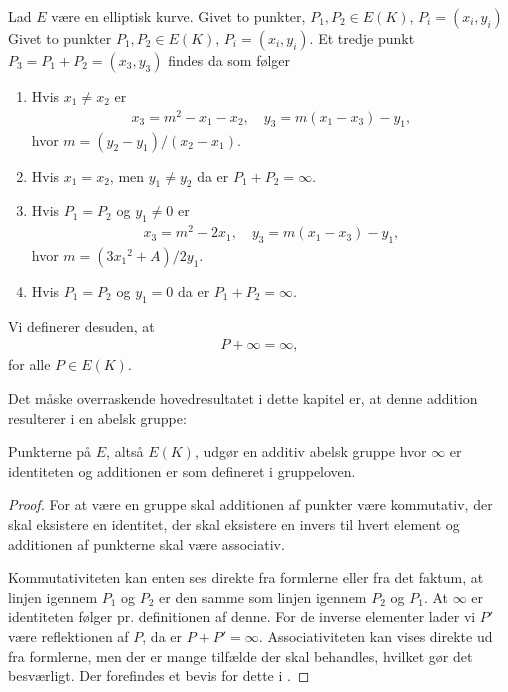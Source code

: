 \begin{definition}[Gruppeloven]
\label{gruppeloven:definitionen}
Lad $E$ være en elliptisk kurve. Givet to punkter, $P_1, P_2 \in E(K)$, $P_i = (x_i, y_i)$
Givet to punkter $P_1, P_2 \in E(K)$, $P_i = (x_i, y_i)$. Et tredje punkt
$P_3 = P_1 + P_2 = (x_3, y_3)$ findes da som følger
\begin{enumerate}
	\item Hvis $x_1 \neq x_2$ er 
	\begin{align*}
		x_3 = m^2 - x_1 - x_2, \quad y_3 = m(x_1 - x_3) - y_1,
	\end{align*}		
	hvor $m = (y_2 - y_1)/(x_2 - x_1)$.
	\item Hvis $x_1 = x_2$, men $y_1 \neq y_2$ da er $P_1 + P_2 = \infty$.
	\item Hvis $P_1 = P_2$ og $y_1 \neq 0$ er 
	\begin{align*}
		x_3 = m^2 - 2x_1, \quad y_3=m(x_1 - x_3) - y_1,
	\end{align*}
	hvor $m=(3{x_1}^2 + A)/2y_1$.
	\item Hvis $P_1 = P_2$ og $y_1 = 0$ da er $P_1 + P_2 = \infty$.
\end{enumerate}
Vi definerer desuden, at 
\begin{align*}
	P + \infty = \infty,
\end{align*}
for alle $P \in E(K)$.
\end{definition}

Det måske overraskende hovedresultatet i dette kapitel er, at denne addition resulterer i en abelsk gruppe:

\begin{thm}
Punkterne på $E$, altså $E(K)$, udgør en additiv abelsk gruppe hvor $\infty$ er identiteten og additionen er som defineret i gruppeloven. 
\end{thm}
\begin{proof}
For at være en gruppe skal additionen af punkter være kommutativ, der skal eksistere en identitet, der skal eksistere en invers til hvert element og additionen af punkterne skal være associativ.

Kommutativiteten kan enten ses direkte fra formlerne eller fra det faktum, at linjen igennem $P_1$ og $P_2$ er den samme som linjen igennem $P_2$ og $P_1$. At $\infty$ er identiteten følger pr. definitionen af denne. For de inverse elementer lader vi $P'$ være reflektionen af $P$, da er $P+P' = \infty$. Associativiteten kan vises direkte ud fra formlerne, men der er mange tilfælde der skal behandles, hvilket gør det besværligt. Der forefindes et bevis for dette i \cite[afsnit~2.4]{Washington}.
\end{proof}